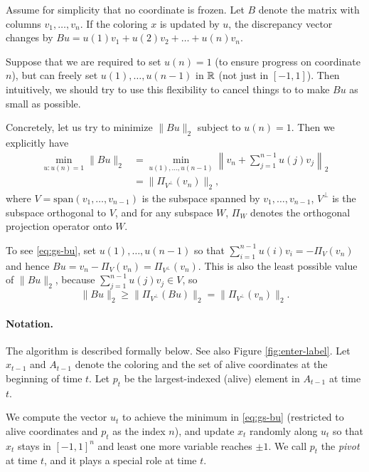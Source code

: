 Assume for simplicity that no coordinate is frozen.
Let $B$ denote the matrix with columns $v_1,\ldots,v_n$. 
If the coloring $x$ is updated by $u$, the discrepancy vector changes by $Bu = u(1) v_1 + u(2) v_2 +  \ldots + u(n) v_n$.

Suppose that we are required to set $u(n)=1$ (to ensure progress on coordinate $n$),   
but can freely set $u(1),\ldots,u(n-1)$ in $\mathbb{R}$ (not just in  $[-1,1]$). Then intuitively, we should try to use this flexibility to cancel things to to make $Bu$ as small as possible. 

Concretely, let us try to minimize $\|Bu\|_2$ subject to $u(n) = 1$.
Then we explicitly have
\begin{align}
\label{eq:gs-bu}
    \min_{u: u(n)=1} \| Bu\|_2 & =  \min_{u(1),\ldots,u(n-1) } \left\|v_n  + \sum_{j=1}^{n-1} u(j) v_j  \right\|_2  \nonumber \\
    & = \|\Pi_{V^\perp} (v_n)\|_2,
\end{align} 
where $V=\text{span}(v_1,\ldots,v_{n-1})$ is the subspace spanned by $v_1,\ldots,v_{n-1}$, $V^\perp$ is the subspace orthogonal to $V$, and for any subspace $W$, $\Pi_W$ denotes the orthogonal projection operator onto  $W$. 

To see \eqref{eq:gs-bu}, set $u(1),\ldots,u(n-1)$ so that
$\sum_{i=1}^{n-1} u(i) v_i = - \Pi_V(v_n)$ and hence $Bu = v_n -
\Pi_V(v_n) =\Pi_{V^\perp} (v_n)$. This is also
the least possible value of $\|Bu\|_2$, because $\sum_{j=1}^{n-1} u(j)
v_j \in V$, so
\[
  \|Bu\|_2 \ge \|\Pi_{V^\perp}(Bu)\|_2 = \|\Pi_{V^\perp} (v_n)\|_2.
\]

\paragraph{Notation.}
 The algorithm is described formally below. See also Figure \ref{fig:enter-label}.
Let $x_{t-1}$ and $ A_{t-1}$ denote the coloring and the set of alive coordinates at the beginning of time $t$. 
Let
 $p_t$ be the largest-indexed (alive) element in $A_{t-1}$ at time $t$. 
 
 We compute the vector $u_t$ to achieve the minimum in \eqref{eq:gs-bu} (restricted to alive coordinates and $p_t$ as the index $n$), and update $x_t$ randomly along $u_t$
 so that $x_t$ stays in $[-1,1]^n$ and least one more variable reaches $\pm 1$.
 We call $p_t$ the \textit{pivot}  at time $t$, and it plays a special role at time $t$.
 



